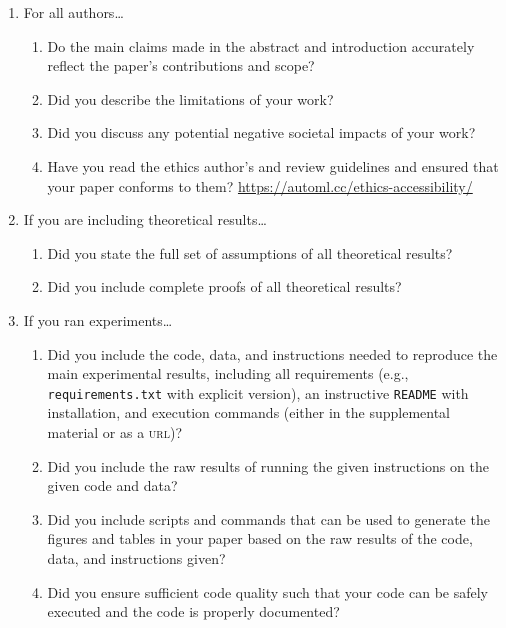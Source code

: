 \documentclass[11pt]{article}
\begin{document}
\begin{enumerate}
\item For all authors\dots
  \begin{enumerate}
  \item Do the main claims made in the abstract and introduction accurately
    reflect the paper's contributions and scope?
    \answerTODO{}
  \item Did you describe the limitations of your work?
    \answerTODO{}
  \item Did you discuss any potential negative societal impacts of your work?
    \answerTODO{}
  \item Have you read the ethics author's and review guidelines and ensured that
    your paper conforms to them? \url{https://automl.cc/ethics-accessibility/}
    \answerTODO{}
  \end{enumerate}
\item If you are including theoretical results\dots
  \begin{enumerate}
  \item Did you state the full set of assumptions of all theoretical results?
    \answerTODO{}
  \item Did you include complete proofs of all theoretical results?
    \answerTODO{}
  \end{enumerate}
\item If you ran experiments\dots
  \begin{enumerate}
  \item Did you include the code, data, and instructions needed to reproduce the
    main experimental results, including all requirements (e.g.,
    \texttt{requirements.txt} with explicit version), an instructive
    \texttt{README} with installation, and execution commands (either in the
    supplemental material or as a \textsc{url})?
    \answerTODO{}
  \item Did you include the raw results of running the given instructions on the
    given code and data?
    \answerTODO{}
  \item Did you include scripts and commands that can be used to generate the
    figures and tables in your paper based on the raw results of the code, data,
    and instructions given?
    \answerTODO{}
  \item Did you ensure sufficient code quality such that your code can be safely
    executed and the code is properly documented?

\end{enumerate}
\end{enumerate}
\end{document}
